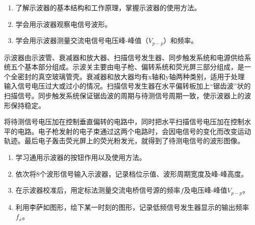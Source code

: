 \documentclass[UTF-8, a4paper, 12pt]{ctexart}
\begin{document}
    \begin{center}

    \end{center}

    \textbf{ }

    \songti

    \begin{enumerate}[（1）]
        \item 了解示波器的基本结构和工作原理，掌握示波器的使用方法。
        \item 学会用示波器观察电信号波形。
        \item 学会用示波器测量交流电信号电压峰-峰值（$V_{p-p}$）和频率。
    \end{enumerate}

    \textbf{ }

    \songti

    示波器由示波管、衰减器和放大器、扫描信号发生器、同步触发系统和电源供给系统五个基本部分组成。示波关主要由电子枪、偏转系统和荧光屏三部分组成，是一个全密封的真空玻璃管壳。衰减器和放大器均有x轴和y轴两种类别，适用于处理输入信号电压过大或过小的情况。扫描信号发生器在水平偏转板加上“锯齿波”状的扫描信号。同步触发系统保证锯齿波的周期与待测信号周期一致，使示波器上的波形保持稳定。

    \textbf{ }

    \songti

    将待测信号电压加在控制垂直偏转的电路中，同时把水平扫描信号电压加在控制水平的电路。电子枪发射的电子束通过这两个电路时，会因电信号的变化而改变运动轨迹。最后电子轰击荧光屏上的荧光粉发光，就得到了待测电信号的波形图像。

    \textbf{ }

    \songti

    \begin{enumerate}[（1）]
        \item 学习通用示波器的按钮作用以及使用方法。
        \item 依次将8个波形信号输入示波器，记录档位示值、波形周期宽度及峰-峰高度。
        \item 在示波器校准后，用定标法测量交流电桥信号源的频率$f$及电压峰-峰值$V_{p-p}$。
        \item 利用李萨如图形，绘下某一时刻的图形，记录低频信号发生器显示的输出频率$f_x$。
    \end{enumerate}
\end{document}
